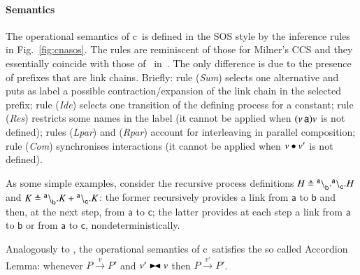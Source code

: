 \paragraph{Semantics}

The operational semantics of c\CNA\ is defined in the SOS style by the inference rules in Fig.~\ref{fig:cnasos}. The rules are reminiscent of those for Milner's CCS and they essentially coincide with those of \CNA\ in~\cite{BBB17}. The only difference is due to the presence of prefixes that are link chains.
Briefly: rule (\textit{Sum}) selects one alternative and puts as label a possible contraction/expansion of the link chain in the selected prefix; rule (\textit{Ide}) selects one transition of the defining process for a constant; rule (\textit{Res}) restricts some names in the label (it cannot be applied when $(\nu\, \mathsf{a})v$ is not defined); rules (\textit{Lpar}) and (\textit{Rpar}) account for interleaving in parallel composition; rule (\textit{Com}) 
synchronises interactions (it cannot be applied when $v \bullet v'$ is not defined).

\begin{example}
As some simple examples, consider the recursive process definitions $H \triangleq {}^{\mathsf{a}} \backslash_{\mathsf{b}}^{}.{}^{\mathsf{a}} \backslash_{\mathsf{c}}^{}.H$ and $K \triangleq {}^{\mathsf{a}} \backslash_{\mathsf{b}}^{}.K + {}^{\mathsf{a}} \backslash_{\mathsf{c}}^{}.K$: the former recursively provides a link from $\mathsf{a}$ to $\mathsf{b}$ and then, at the next step, from $\mathsf{a}$ to $\mathsf{c}$; the latter provides at each step a link from $\mathsf{a}$ to $\mathsf{b}$ or from $\mathsf{a}$ to $\mathsf{c}$, nondeterministically. 
\end{example}

Analogously to \CNA, the operational semantics of c\CNA\ satisfies the so called Accordion Lemma: whenever $P \xrightarrow{v} P'$ and $v'\blackstretcheq v$ then $P \xrightarrow{v'} P'$.


